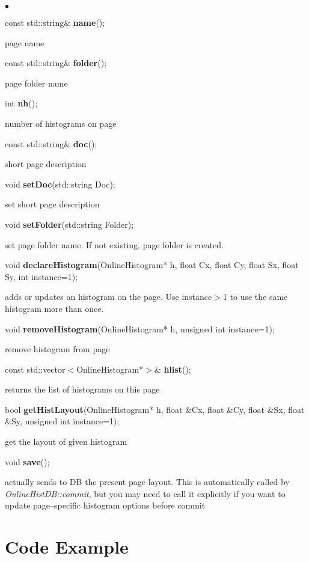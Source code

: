 \documentclass{lhcbnote}
\begin{document}
\begin{list}{$\bullet$}{}
\item   const std::string\& {\bf name}();

page name
\item   const std::string\& {\bf folder}();

page folder name
\item   int {\bf nh}();

number of histograms on page
\item   const std::string\& {\bf doc}();

short page description
\item void {\bf setDoc}(std::string Doc);

set short page description
\item   void {\bf setFolder}(std::string Folder);

set page folder name. If not existing, page folder is created.
\item   void {\bf declareHistogram}(OnlineHistogram* h,
		    float Cx,
		    float Cy,
		    float Sx,
		    float Sy,
		    int instance=1);

adds or updates an histogram on the page. Use instance$>$1 to use the
same histogram more than once. 

\item   void {\bf removeHistogram}(OnlineHistogram* h, unsigned int instance=1);

remove histogram from page
\item   const std::vector$<$OnlineHistogram*$>$\& { \bf hlist}();

returns the list of histograms on this page
\item   bool {\bf getHistLayout}(OnlineHistogram* h,
		     float \&Cx,
		     float \&Cy,
		     float \&Sx,
		     float \&Sy,
		     unsigned int instance=1);


get the layout of given histogram 
\item void {\bf save}();

actually sends to DB the present page layout. This is automatically
called by  {\it OnlineHistDB::commit}, but you may need to call it
explicitly if you want to update page--specific histogram options
before commit 
\end{list}


\section{Code Example}
\end{document}
